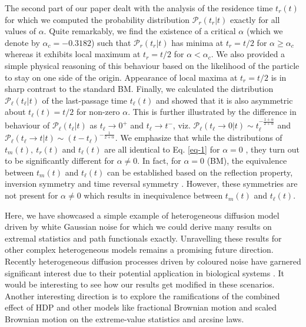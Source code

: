 \documentclass[showpacs,amsmath,amssymb,aps,pre,twocolumn,]{revtex4-1}
\def\greenw#1{{\color{black} #1}}
\def\bluew#1{{\color{black} #1}}
\begin{document}
The second part of our paper dealt with the analysis of the residence time $t_r(t)$ for which we computed the probability distribution $\mathcal{P}_r \left( t_r|t\right)$ exactly for all values of $\alpha$. Quite remarkably, we find the existence of a critical $\alpha$ (which we denote by $\alpha _c = -0.3182$) such that $\mathcal{P}_r \left( t_r|t\right)$ has minima at $t_r = t/2$ for $\alpha \geq \alpha _c$ whereas it exhibits local maximum at $t_r = t/2$ for $\alpha < \alpha _c$. We also provided a simple physical reasoning of this behaviour based on the likelihood of the particle to stay on one side of the origin. \greenw{Appearance of local maxima at $t_r=t/2$ is in sharp contrast to the standard BM.} Finally, we calculated the distribution  $\mathcal{P}_{\ell} \left( t_{\ell}|t\right)$ of the last-passage time $t _{\ell}(t)$ and showed that it is also asymmetric about $t _{\ell}(t) = t/2$ for non-zero $\alpha$. This is further illustrated by the difference in behaviour of $\mathcal{P}_{\ell} \left( t_{\ell}|t\right)$ as $t _{\ell}  \to 0^+$ and $t _{\ell}  \to t^-$, viz. $\mathcal{P}_{\ell} \left( t_{\ell} \to 0|t\right)\sim t_{\ell}^{-\frac{1+\alpha}{2+\alpha}} $ and $\mathcal{P}_{\ell} \left( t_{\ell} \to t|t\right)\sim(t- t_{\ell})^{-\frac{1}{2+\alpha}} $. \greenw{We emphasize that while the distributions of $t_m(t),~t_r(t)$ and $t _{\ell}(t)$ are all identical to Eq. \eqref{eq-1} for $\alpha =0$ , they turn out to be significantly different for $\alpha \neq 0$.} In fact, for $\alpha =0$ (BM), the equivalence between $t_m(t)$ and  $t _{\ell}(t)$ can be established based on the reflection property, inversion symmetry and time reversal symmetry \bluew{\cite{Feller}}. However, these symmetries are not present for $\alpha \neq 0$ which results in inequivalence between $t_m(t)$ and  $t _{\ell}(t)$.

Here, we have showcased a simple example of heterogeneous diffusion model driven by white Gaussian noise for which we could derive many results on extremal statistics and path functionals exactly. Unravelling these results for other complex heterogeneous models remains a promising future direction. Recently heterogeneous diffusion processes driven by coloured noise have garnered significant interest due to their potential application in biological systems \cite{MutothyaXu2021,Mutothya2021,Xu2020}. It would be interesting to see how our results get modified in these scenarios. \greenw{Another interesting direction is to explore the ramifications of the combined effect of HDP and other models like fractional Brownian motion \cite{tmax-FBM-3,tmax-FBM-1,new1, Rnew2} and scaled Brownian motion \cite{Rnew1} on the extreme-value statistics and arcsine laws.} 
\end{document}
